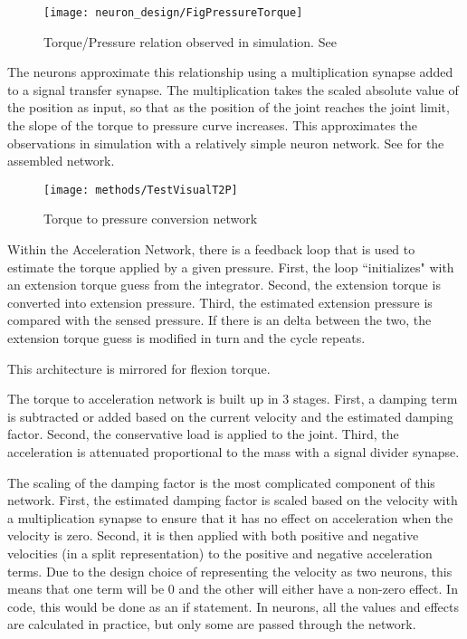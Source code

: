 \begin{figure}
\centering
\texttt{[image: neuron\_design/FigPressureTorque]}
\caption{Torque/Pressure relation observed in simulation. See }
\label{fig:PressureTorque}
\end{figure}

The neurons approximate this relationship using a multiplication synapse added
to a signal transfer synapse. The multiplication takes the scaled absolute 
value of the position as input, so that as the position of the joint reaches
the joint limit, the slope of the torque to pressure curve increases. This
approximates the observations in simulation with a relatively simple neuron
network. See  for the assembled network.

\begin{figure}
\centering
\texttt{[image: methods/TestVisualT2P]}
\caption{Torque to pressure conversion network}
\label{fig:T2PNetwork}
\end{figure}


Within the Acceleration Network, there is a feedback loop that is used to 
estimate the torque applied by a given pressure. First, the loop ``initializes"
with an extension torque guess from the integrator. Second, the extension
torque is converted into extension pressure. Third, the estimated extension
pressure is compared with the sensed pressure. If there is an delta between the
two, the extension torque guess is modified in turn and the cycle repeats.

This architecture is mirrored for flexion torque.


The torque to acceleration network is built up in 3 stages. First, a damping 
term is subtracted or added based on the current velocity and the estimated
damping factor. Second, the conservative load is applied to the joint. Third,
the acceleration is attenuated proportional to the mass with a signal divider
synapse.

The scaling of the damping factor is the most complicated component of this
network. First, the estimated damping factor is scaled based on the velocity 
with a multiplication synapse to ensure that it has no effect on acceleration
when the velocity is zero. Second, it is then applied with both positive and
negative velocities (in a split representation) to the positive and negative
acceleration terms. Due to the design choice of representing the velocity as two
neurons, this means that one term will be 0 and the other will either have a 
non-zero effect. In code, this would be done as an if statement. In neurons,
all the values and effects are calculated in practice, but only some are passed
through the network.

